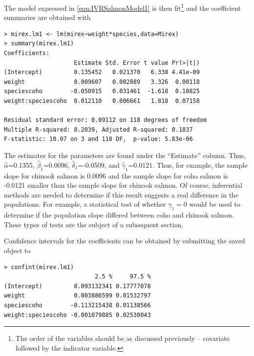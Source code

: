 \documentclass[10pt,openany]{book}\usepackage[]{graphicx}\usepackage[]{color}
\makeatletter
\newenvironment{kframe}{%
 \def\at@end@of@kframe{}%
 \ifinner\ifhmode%
  \def\at@end@of@kframe{\end{minipage}}%
  \begin{minipage}{\columnwidth}%
 \fi\fi%
 \def\FrameCommand##1{\hskip\@totalleftmargin \hskip-\fboxsep
 \colorbox{shadecolor}{##1}\hskip-\fboxsep
     \hskip-\linewidth \hskip-\@totalleftmargin \hskip\columnwidth}%
 \MakeFramed {\advance\hsize-\width
   \@totalleftmargin\z@ \linewidth\hsize
   \@setminipage}}%
 {\par\unskip\endMakeFramed%
 \at@end@of@kframe}
\newenvironment{knitrout}{}{} %
\makeatother
\begin{document}
The model expressed in \eqref{eqn:IVRSalmonModel1} is then fit\footnote{The order of the variables should be as discussed previously -- covariate followed by the indicator variable.} and the coefficient summaries are obtained with

\begin{knitrout}
\color{fgcolor}\begin{kframe}
\begin{verbatim}
> mirex.lm1 <- lm(mirex~weight*species,data=Mirex)
> summary(mirex.lm1)
Coefficients:
                    Estimate Std. Error t value Pr(>|t|)
(Intercept)         0.135452   0.021370   6.338 4.41e-09
weight              0.009607   0.002889   3.326  0.00118
speciescoho        -0.050915   0.031461  -1.618  0.10825
weight:speciescoho  0.012110   0.006661   1.818  0.07158

Residual standard error: 0.09112 on 118 degrees of freedom
Multiple R-squared: 0.2039,	Adjusted R-squared: 0.1837 
F-statistic: 10.07 on 3 and 118 DF,  p-value: 5.83e-06 
\end{verbatim}
\end{kframe}
\end{knitrout}

The estimates for the parameters are found under the ``Estimate'' column.  Thus, $\hat{\alpha}$=0.1355, $\hat{\beta}_{1}$=0.0096, $\hat{\delta}_{1}$=-0.0509, and $\hat{\gamma}_{1}$=0.0121.  Thus, for example, the sample slope for chinook salmon is 0.0096 and the sample slope for coho salmon is -0.0121 smaller than the sample slope for chinook salmon.  Of course, inferential methods are needed to determine if this result suggests a real difference in the populations.  For example, a statistical test of whether $\gamma_{1}=0$ would be used to determine if the population slope differed between coho and chinook salmon.  These types of tests are the subject of a subsequent section.

Confidence intervals for the coefficients can be obtained by submitting the saved  object to 
\begin{knitrout}
\color{fgcolor}\begin{kframe}
\begin{verbatim}
> confint(mirex.lm1)
                          2.5 %     97.5 %
(Intercept)         0.093132341 0.17777078
weight              0.003886599 0.01532797
speciescoho        -0.113215438 0.01138566
weight:speciescoho -0.001079885 0.02530043
\end{verbatim}
\end{kframe}
\end{knitrout}
\end{document}
